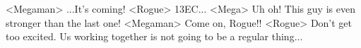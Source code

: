 <Megaman> ...It's coming! 
<Rogue> {13}{EC}... 
<Mega> Uh oh! This guy is even stronger than the last one! 
<Megaman> Come on, Rogue!! 
<Rogue> Don't get too excited. Us working together is not going to be a regular thing... 
